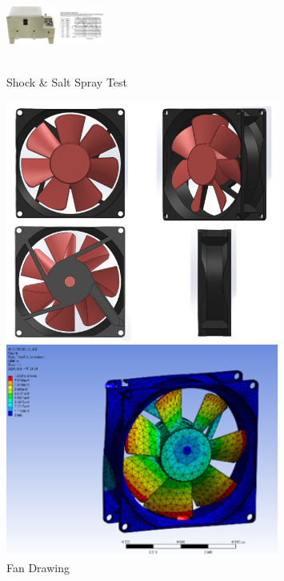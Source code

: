 \documentclass[10pt, letterpaper]{article}
\begin{document}
\begin{figure}[!b]
\begin{minipage}[c]{0.33\linewidth}
                \includegraphics[width=3.2cm]{fig/SGS Intern/Salt Spray Test.jpg}
            \caption{\\Shock  \& Salt Spray Test}
        \end{minipage}

        \vspace{0.1 cm}
        
        \begin{minipage}[c]{0.33\linewidth}
            \centering
            \includegraphics[width=0.8\textwidth]{fig/SGS Intern/Fan Drawing (Solidworks).png}
            \caption{Fan Drawing}
        \end{minipage} %
        \begin{minipage}[c]{0.33\linewidth}
            \centering
            \includegraphics[width=0.8\textwidth]{fig/SGS Intern/Structure.png}

\end{minipage}
\end{figure}
\end{document}
